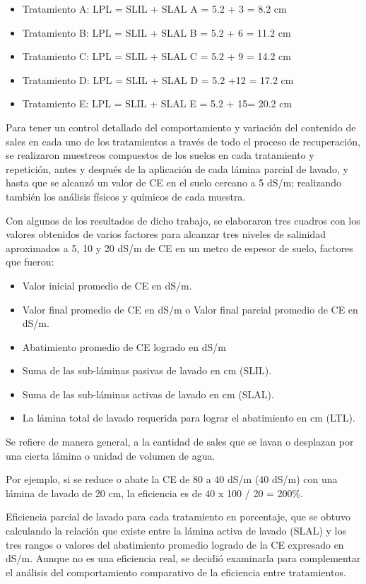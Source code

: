 \begin{itemize}
    \item Tratamiento A: LPL = SLIL + SLAL A = 5.2 + 3 = 8.2 cm
    \item Tratamiento B: LPL = SLIL + SLAL B = 5.2 + 6 = 11.2 cm
    \item Tratamiento C: LPL = SLIL + SLAL C = 5.2 + 9 = 14.2 cm
    \item Tratamiento D: LPL = SLIL + SLAL D = 5.2 +12 = 17.2 cm
    \item Tratamiento E: LPL = SLIL + SLAL E = 5.2 + 15= 20.2 cm
\end{itemize}
Para tener un control detallado del comportamiento y variación del contenido de sales en cada uno de los tratamientos a través de todo el proceso de recuperación, se realizaron muestreos compuestos de los suelos en cada tratamiento y repetición, antes y después de la aplicación de cada lámina parcial de lavado, y hasta que se alcanzó un valor de CE en el suelo cercano a 5 dS/m; realizando también los análisis físicos y químicos de cada muestra.

Con algunos de los resultados de dicho trabajo, se elaboraron tres cuadros con los valores obtenidos de varios factores para alcanzar tres niveles de salinidad aproximados a 5, 10 y 20 dS/m de CE en un metro de espesor de suelo, factores que fueron:
\begin{itemize}
    \item Valor inicial promedio de CE en dS/m.
    \item Valor final promedio de CE en dS/m o Valor final parcial promedio de CE en dS/m.
    \item Abatimiento promedio de CE logrado en dS/m
    \item Suma de las sub-láminas pasivas de lavado en cm (SLIL).
    \item Suma de las sub-láminas activas de lavado en cm (SLAL).
    \item La lámina total de lavado requerida para lograr el abatimiento en cm (LTL).
\end{itemize}
\begin{definition}
    Se refiere de manera general, a la cantidad de sales que se lavan o desplazan por una cierta lámina o unidad de volumen de agua.
\end{definition}
Por ejemplo, si se reduce o abate la CE de 80 a 40 dS/m (40 dS/m) con una lámina de lavado de 20 cm, la eficiencia es de 40 x 100 / 20 = 200\%.

Eficiencia parcial de lavado para cada tratamiento en porcentaje, que se obtuvo calculando la relación que existe entre la lámina activa de lavado (SLAL) y los tres rangos o valores del abatimiento promedio logrado de la CE expresado en dS/m. Aunque no es una eficiencia real, se decidió examinarla para complementar el análisis del comportamiento comparativo de la eficiencia entre tratamientos.

